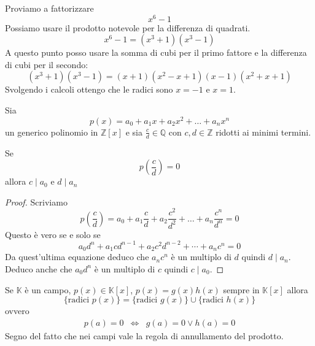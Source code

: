 \begin{example}
	Proviamo a fattorizzare
	\begin{equation*}
		x^6 - 1
	\end{equation*}
	Possiamo usare il prodotto notevole per la differenza di quadrati.
	\begin{equation*}
		x^6 - 1 = (x^3 + 1)(x^3 - 1)
	\end{equation*}
	A questo punto posso usare la somma di cubi per il primo fattore e la differenza di cubi per
	il secondo:
	\begin{equation*}
		(x^3 + 1)(x^3 - 1) = (x + 1)(x^2 - x + 1)(x - 1)(x^2 + x + 1)
	\end{equation*}
	Svolgendo i calcoli ottengo che le radici sono $x = -1$ e $x = 1$.
\end{example}

\begin{theorem}
	Sia
	\begin{equation*}
		p(x) = a_0 + a_1 x + a_2 x^2 + \dots + a_n x^n
	\end{equation*}
	un generico polinomio in $\mathbb{Z}[x]$ e sia $\frac{c}{d}  \in \mathbb{Q}$ con
	$c, d \in \mathbb{Z}$ ridotti ai minimi termini.

	Se
	\begin{equation*}
		p \left( \frac{c}{d} \right) = 0
	\end{equation*}
	allora $c \mid a_0$ e $d \mid a_n$
	\begin{proof}
		Scriviamo
		\begin{equation*}
			p \left( \frac{c}{d} \right) =
			a_0 + a_1 \frac{c}{d} + a_2 \frac{c^2}{d^2} + \dots + a_n \frac{c^n}{d^n} = 0
		\end{equation*}
		Questo \`e vero se e solo se
		\begin{equation*}
			a_0 d^n + a_1 c d^{n - 1} + a_2 c^2 d^{n-2} + \cdots + a_n c^n = 0
		\end{equation*}
		Da quest'ultima equazione deduco che $a_n c^n$ \`e un multiplo di $d$ quindi $d \mid a_n$.
		Deduco anche che $a_0 d^n$ \`e un multiplo di $c$ quindi $c \mid a_0$.
	\end{proof}
\end{theorem}

\begin{theorem}
	Se $\mathbb{K}$ \`e un campo, $p(x) \in \mathbb{K}[x]$, $p(x) = g(x)h(x)$ sempre in
	$\mathbb{K}[x]$ allora
	\begin{equation*}
		\{ \text{radici } p(x) \} =
		\{ \text{radici } g(x) \} \cup \{ \text{radici } h(x) \}
	\end{equation*}
	ovvero
	\begin{equation*}
		\begin{array}{ccc}
			p(a) = 0 & \Leftrightarrow & g(a) = 0 \vee h(a) = 0
		\end{array}
	\end{equation*}
	Segno del fatto che nei campi vale la regola di annullamento del prodotto.
\end{theorem}

